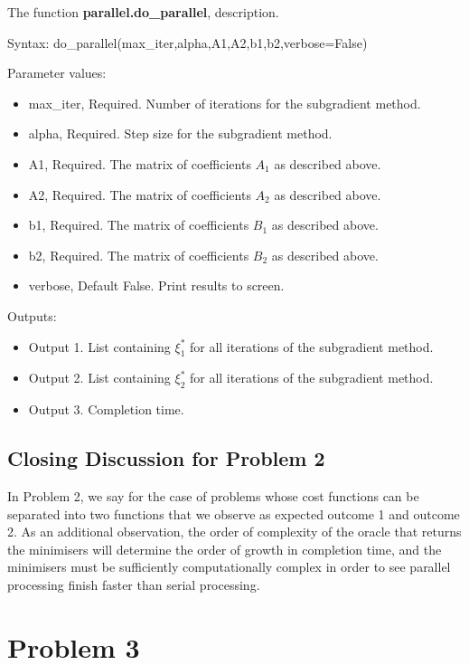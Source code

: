 \documentclass[12pt]{article}
\begin{document}
\noindent The function \textbf{parallel.do\_parallel}, description.

Syntax: do\_parallel(max\_iter,alpha,A1,A2,b1,b2,verbose=False)

Parameter values:
\begin{itemize}
	\item max\_iter, Required. Number of iterations for the subgradient method.
	\item alpha, Required. Step size for the subgradient method.
	\item A1, Required. The matrix of coefficients $A_1$ as described above.
	\item A2, Required. The matrix of coefficients $A_2$ as described above.
	\item b1, Required. The matrix of coefficients $B_1$ as described above.
	\item b2, Required. The matrix of coefficients $B_2$ as described above.
	\item verbose, Default False. Print results to screen.
\end{itemize}

Outputs:
\begin{itemize}
	\item Output 1. List containing $\xi_1^*$ for all iterations of the subgradient method.
	\item Output 2. List containing $\xi_2^*$ for all iterations of the subgradient method.
	\item Output 3. Completion time.
\end{itemize}

\subsection*{Closing Discussion for Problem 2}

In Problem 2, we say for the case of problems whose cost functions can be separated into two functions that we observe as expected outcome 1 and outcome 2. As an additional observation, the order of complexity of the oracle that returns the minimisers will determine the order of growth in completion time, and the minimisers must be sufficiently computationally complex in order to see parallel processing finish faster than serial processing.

\section*{Problem 3}
\end{document}
